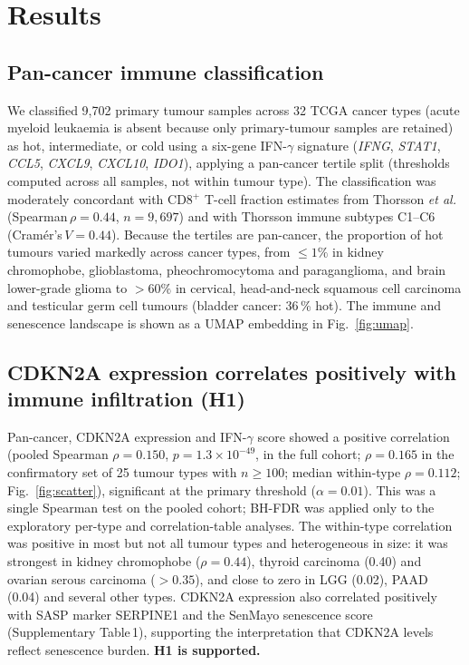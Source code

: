 \documentclass[10pt,twocolumn]{article}
\begin{document}
\section{Results}

\subsection{Pan-cancer immune classification}

We classified 9,702 primary tumour samples across 32 TCGA cancer types
(acute myeloid leukaemia is absent because only primary-tumour samples
are retained) as hot, intermediate, or cold using a six-gene
IFN-$\gamma$ signature (\textit{IFNG}, \textit{STAT1}, \textit{CCL5},
\textit{CXCL9}, \textit{CXCL10}, \textit{IDO1}), applying a pan-cancer
tertile split (thresholds computed across all samples, not within
tumour type). The classification was moderately concordant with CD8$^+$
T-cell fraction estimates from Thorsson \textit{et al.}\cite{Thorsson2018}
(Spearman\,$\rho=0.44$, $n=9{,}697$) and with Thorsson immune subtypes
C1--C6 (Cramér's\,$V=0.44$). Because the tertiles are pan-cancer, the
proportion of hot tumours varied markedly across cancer types, from
$\leq1\%$ in kidney chromophobe, glioblastoma, pheochromocytoma and
paraganglioma, and brain lower-grade glioma to $>60\%$ in cervical,
head-and-neck squamous cell carcinoma and testicular germ cell tumours
(bladder cancer: 36\,\% hot). The immune and senescence landscape is
shown as a UMAP embedding in Fig.~\ref{fig:umap}.

\subsection{CDKN2A expression correlates positively with immune
infiltration (H1)}

Pan-cancer, CDKN2A expression and IFN-$\gamma$ score showed a
positive correlation (pooled Spearman $\rho=0.150$, $p=1.3\times10^{-49}$,
in the full cohort; $\rho=0.165$ in the confirmatory set of 25 tumour types
with $n\geq100$; median within-type
$\rho=0.112$; Fig.~\ref{fig:scatter}), significant at the primary
threshold ($\alpha=0.01$). This was a single Spearman test on the pooled
cohort; BH-FDR was applied only to the exploratory per-type and
correlation-table analyses. The within-type correlation was positive in
most but not all tumour types and heterogeneous in size: it was
strongest in kidney chromophobe ($\rho=0.44$), thyroid carcinoma
(0.40) and ovarian serous carcinoma ($>0.35$), and close to zero in
LGG (0.02), PAAD (0.04) and several other types.
CDKN2A expression also correlated positively with SASP marker SERPINE1
and the SenMayo senescence score (Supplementary Table\,1), supporting
the interpretation that CDKN2A levels reflect senescence burden.
\textbf{H1 is supported.}
\end{document}
